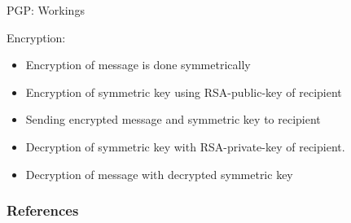 \documentclass[handout]{beamer}
\begin{document}
\begin{frame}{PGP: Workings}
	\begin{minipage}[T][5cm][t]{0.45\textwidth}
		Encryption:
		\begin{itemize}
			\item<1->Encryption of message is done symmetrically
			\item<2->Encryption of symmetric key using RSA-public-key of recipient
			\item<3->Sending encrypted message and symmetric key to recipient
		\end{itemize}
	\end{minipage}
	\hfill
	\begin{minipage}[T][5cm][t]{0.45\textwidth}
		\begin{itemize}
			\item<4->Decryption of symmetric key with RSA-private-key of recipient.
			\item<5->Decryption of message with decrypted symmetric key
		\end{itemize}
	\end{minipage}
\end{frame}
\fi

\begin{frame}%
	\frametitle{References}
	
	
\end{frame}
\end{document}
